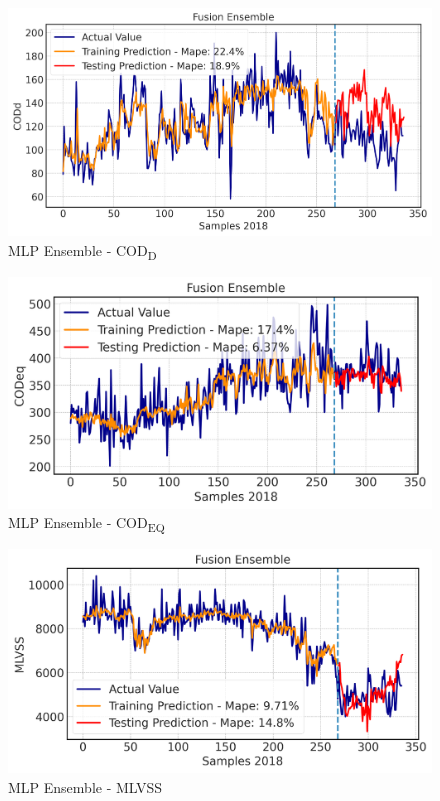 \begin{figure}[h]
\centering
\includegraphics[width=\linewidth]{figures/Ch5/CODd-ann.pdf}
\caption{MLP Ensemble - COD\textsubscript{D}}
\label{f:ann-codd}
\end{figure}

\begin{figure}[h]
\centering
\includegraphics[width=\linewidth]{figures/Ch5/CODeq-ann.pdf}
\caption{MLP Ensemble - COD\textsubscript{EQ}}
\label{f:ann-codeq}
\end{figure}

\begin{figure}[h]
\centering
\includegraphics[width=\linewidth]{figures/Ch5/MVLSS-E_ann.pdf}
\caption{MLP Ensemble - MLVSS}
\label{f:ann-MLVSS}
\end{figure}

